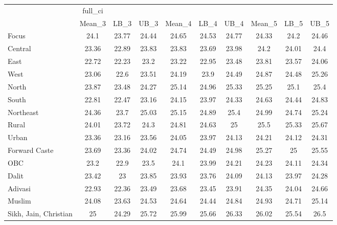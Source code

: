 \begin{tabular}{l*{9}{c}}
\hline\hline
                    &     full\_ci&            &            &            &            &            &            &            &            \\
                    &      Mean\_3&        LB\_3&        UB\_3&      Mean\_4&        LB\_4&        UB\_4&      Mean\_5&        LB\_5&        UB\_5\\
\hline
Focus               &        24.1&       23.77&       24.44&       24.65&       24.53&       24.77&       24.33&        24.2&       24.46\\
Central             &       23.36&       22.89&       23.83&       23.83&       23.69&       23.98&        24.2&       24.01&        24.4\\
East                &       22.72&       22.23&        23.2&       23.22&       22.95&       23.48&       23.81&       23.57&       24.06\\
West                &       23.06&        22.6&       23.51&       24.19&        23.9&       24.49&       24.87&       24.48&       25.26\\
North               &       23.87&       23.48&       24.27&       25.14&       24.96&       25.33&       25.25&        25.1&        25.4\\
South               &       22.81&       22.47&       23.16&       24.15&       23.97&       24.33&       24.63&       24.44&       24.83\\
Northeast           &       24.36&        23.7&       25.03&       25.15&       24.89&        25.4&       24.99&       24.74&       25.24\\
Rural               &       24.01&       23.72&        24.3&       24.81&       24.63&          25&        25.5&       25.33&       25.67\\
Urban               &       23.36&       23.16&       23.56&       24.05&       23.97&       24.13&       24.21&       24.12&       24.31\\
Forward Caste       &       23.69&       23.36&       24.02&       24.74&       24.49&       24.98&       25.27&          25&       25.55\\
OBC                 &        23.2&        22.9&        23.5&        24.1&       23.99&       24.21&       24.23&       24.11&       24.34\\
Dalit               &       23.42&          23&       23.85&       23.93&       23.76&       24.09&       24.13&       23.97&       24.28\\
Adivasi             &       22.93&       22.36&       23.49&       23.68&       23.45&       23.91&       24.35&       24.04&       24.66\\
Muslim              &       24.08&       23.63&       24.53&       24.64&       24.44&       24.84&       24.93&       24.71&       25.14\\
Sikh, Jain, Christian&          25&       24.29&       25.72&       25.99&       25.66&       26.33&       26.02&       25.54&        26.5\\
\hline\hline
\end{tabular}